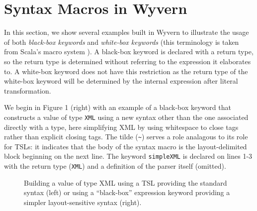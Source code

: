 \documentclass[letterpaper, notitlepage]{article}
\begin{document}
\section{Syntax Macros in Wyvern}
In this section, we show several examples built in Wyvern to illustrate the usage of both \emph{black-box keywords} and \emph{white-box keywords} (this terminology is taken from Scala's macro system \cite{ScalaMacros2013}). A black-box keyword is declared with a return type, so the return type is determined without referring to the expression it elaborates to. A white-box keyword does not have this restriction as the return type of the white-box keyword will be determined by the internal expression after literal transformation.

We begin in Figure 1 (right) with an example of a black-box keyword that constructs a value of type \verb|XML| using a new syntax other than the one associated directly with a type, here simplifying XML by using whitespace to close tags rather than explicit closing tags. The tilde (\verb|~|) serves a role analagous to its role for TSLs: it indicates that the body of the syntax macro is the layout-delimited block beginning on the next line. The keyword \texttt{simpleXML} is declared on lines 1-3 with the return type (\texttt{XML}) and a definition of the parser itself (omitted).



\begin{figure*}[htb!]
\vspace{-15px}
\begin{parcolumns}{2}
\end{parcolumns}
\vspace{-15px}
\caption{Building a value of type XML using a TSL providing the standard syntax (left) or using a ``black-box'' expression keyword providing a simpler layout-sensitive syntax (right).}
\label{xml}
\vspace{-15px}
\end{figure*}
\end{document}

